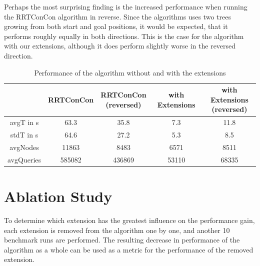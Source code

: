 \documentclass[a4paper,12pt]{article}
\begin{document}
Perhaps the most surprising finding is the increased performance when running the RRTConCon algorithm in reverse. Since the algorithms uses two trees growing from both start and goal positions, it would be expected, that it performs roughly equally in both directions.
This is the case for the algorithm with our extensions, although it does perform slightly worse in the reversed direction.

\begin{table}[H]
    \centering
    \begin{tabular}{|c|c|c|c|c|}
        \hline
                   & RRTConCon & \shortstack{RRTConCon \\ (reversed)} & with Extensions & \shortstack{with Extensions \\ (reversed)} \\
        \hline 
        avgT in s  & 63.3     & 35.8                  & 7.3             & 11.8  \\  
        stdT in s  & 64.6     & 27.2                  & 5.3             & 8.5   \\
        avgNodes   & 11863    & 8483                  & 6571            & 8511  \\
        avgQueries & 585082   & 436869                & 53110           & 68335 \\
    \hline
    \end{tabular}
    \caption{Performance of the algorithm without and with the extensions}
    \label{tab:performance_summary}
\end{table}

\section{Ablation Study}

To determine which extension has the greatest influence on the performance gain, each extension is removed from the algorithm one by one, and another 10 benchmark runs are performed. The resulting decrease in performance of the algorithm as a whole can be used as a metric for the performance of the removed extension.
\end{document}
